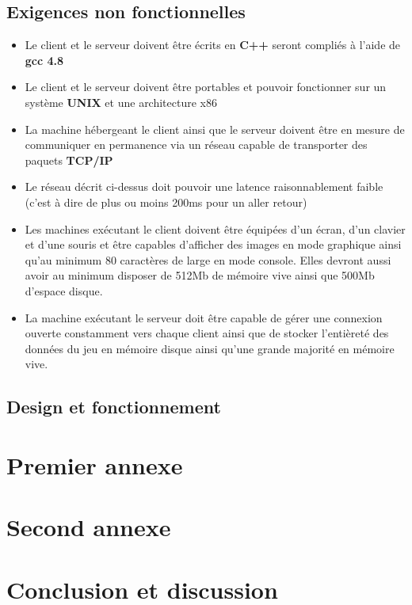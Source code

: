 \documentclass[a4paper]{article}
\begin{document}
\subsection{Exigences non fonctionnelles}
\label{enf}
\begin{itemize}
\item Le client et le serveur doivent être écrits en \textbf{C++} seront compliés à l'aide de \textbf{gcc 4.8}
\item Le client et le serveur doivent être portables et pouvoir fonctionner sur un système \textbf{UNIX} et une architecture x86
\item La machine hébergeant le client ainsi que le serveur doivent être en mesure de communiquer en permanence via un réseau capable de transporter des paquets \textbf{TCP/IP}
\item Le réseau décrit ci-dessus doit pouvoir une latence raisonnablement faible (c'est à dire de plus ou moins 200ms pour un aller retour)
\item Les machines exécutant le client doivent être équipées d'un écran, d'un clavier et d'une souris et être capables d'afficher des images en mode graphique ainsi qu'au minimum 80 caractères de large en mode console. Elles devront aussi avoir au minimum disposer de 512Mb de mémoire vive ainsi que 500Mb d'espace disque.
\item La machine exécutant le serveur doit être capable de gérer une connexion ouverte constamment vers chaque client ainsi que de stocker l'entièreté des données du jeu en mémoire disque ainsi qu'une grande majorité en mémoire vive.
\end{itemize}

\subsection{Design et fonctionnement}

\printindex
\appendix

\section{Premier annexe}
\section{Second annexe}

\section{Conclusion et discussion}

\tableofcontents
\listoffigures
\listoftables
\end{document}
